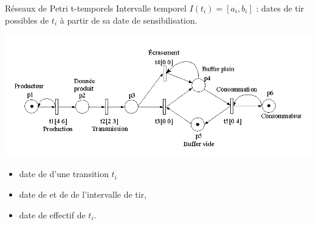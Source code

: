 \documentclass[compress]{beamer}
\begin{document}
\begin{frame}{Réseaux de Petri t-temporels}
Intervalle temporel $I(t_i)=[a_i,b_i]$ : dates de tir possibles de $t_i$ à partir de sa date de
sensibilisation.
\begin{center}
\includegraphics[width=.8\linewidth]{rdp_exo}
\end{center}
\begin{itemize}
\item date de  d'une transition $t_i$
\item date de  et de  de l'intervalle de tir,
\item date de  effectif de $t_i$.
\end{itemize}
\end{frame}

\end{document}
